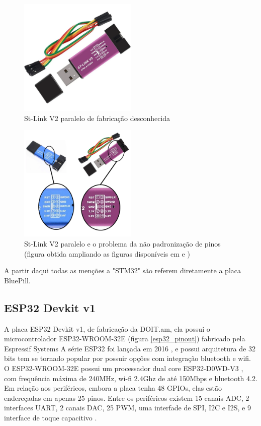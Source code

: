 \begin{figure}[ht]
	\centering
	\includegraphics[width=0.5\textwidth]{figures/stlinkv2_cheap}
	\caption{St-Link V2 paralelo de fabricação desconhecida \cite{stlinkv2_cheap_ref}}
    \label{stlinkv2_cheap}
\end{figure}


\begin{figure}[htb]
	\centering
	\includegraphics[width=0.5\textwidth]{figures/stlinkv2_cheap_pin_diff}
	\caption{St-Link V2 paralelo e o problema da não padronização de pinos
		(figura obtida ampliando as figuras disponíveis em \cite{stlinkv2_cheap_ref} e \cite{stlinkv2_cheap_pin_diff_ref})
	}
    \label{stlinkv2_cheap_pin_diff}
\end{figure}

A partir daqui todas as menções a "STM32" são referem diretamente a  placa BluePill.


\subsection{ESP32 Devkit v1}

A placa ESP32 Devkit v1, de fabricação da DOIT.am, ela possui o microcontrolador ESP32-WROOM-32E (figura \ref{esp32_pinout}) fabricado pela Espressif Systems
A série ESP32 foi lançada em 2016 \cite{anuncio_esp32}, e possui arquitetura de 32 bits
tem se tornado popular por possuir opções com integração bluetooth e wifi.
O ESP32-WROOM-32E possui um processador dual core ESP32-D0WD-V3 \cite{esp32_wroom_32e_datasheet}, com frequência máxima de 240MHz, wi-fi 2.4Ghz de até 150Mbps e
bluetooth 4.2. Em relação aos periféricos, embora a placa tenha 48 GPIOs, elas estão endereçadas em apenas 25 pinos.
Entre os periféricos existem 15 canais ADC, 2 interfaces UART, 
2 canais DAC, 25 PWM, uma interfade de SPI, I2C e I2S, e 9 interface de toque capacitivo \cite{esp32_reference_2} \cite{esp32_reference}.

